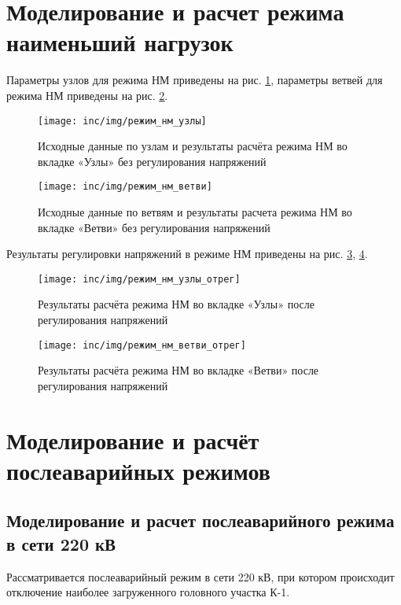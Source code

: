 \section{Моделирование и расчет режима наименьший нагрузок}

Параметры узлов для режима НМ приведены на рис. \ref{fig:режим_нм_узлы}, параметры ветвей для режима НМ приведены на рис. \ref{fig:режим_нм_ветви}.

\begin{figure}[H]
	\centering
	\texttt{[image: inc/img/режим\_нм\_узлы]}
	\caption{Исходные данные по узлам и результаты расчёта режима НМ во вкладке «Узлы» без регулирования напряжений}
	\label{fig:режим_нм_узлы}
\end{figure}

\begin{figure}[H]
	\centering
	\texttt{[image: inc/img/режим\_нм\_ветви]}
	\caption{Исходные данные по ветвям и результаты расчета режима НМ во вкладке «Ветви» без регулирования напряжений}
	\label{fig:режим_нм_ветви}
\end{figure}

Результаты регулировки напряжений в режиме НМ приведены на рис. \ref{fig:режим_нм_узлы_отрег}, \ref{fig:режим_нм_ветви_отрег}.

\begin{figure}[H]
	\centering
	\texttt{[image: inc/img/режим\_нм\_узлы\_отрег]}
	\caption{Результаты расчёта режима НМ во вкладке «Узлы» после регулирования напряжений}
	\label{fig:режим_нм_узлы_отрег}
\end{figure}

\begin{figure}[H]
	\centering
	\texttt{[image: inc/img/режим\_нм\_ветви\_отрег]}
	\caption{Результаты расчёта режима НМ во вкладке «Ветви» после регулирования напряжений}
	\label{fig:режим_нм_ветви_отрег}
\end{figure}

\section{Моделирование и расчёт послеаварийных режимов}

\subsection{Моделирование и расчет послеаварийного режима в сети 220 кВ}

Рассматривается послеаварийный режим в сети 220 кВ, при котором происходит отключение наиболее загруженного головного участка К-1.

